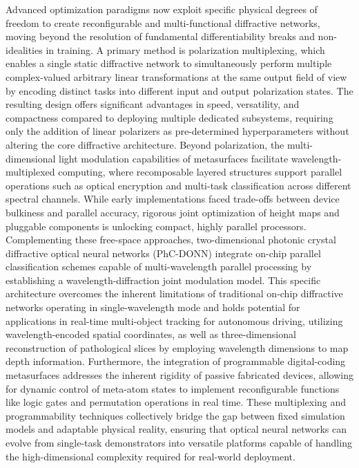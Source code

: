 Advanced optimization paradigms now exploit specific physical degrees of freedom to create reconfigurable and multi-functional diffractive networks, moving beyond the resolution of fundamental differentiability breaks and non-idealities in training. A primary method is polarization multiplexing, which enables a single static diffractive network to simultaneously perform multiple complex-valued arbitrary linear transformations at the same output field of view by encoding distinct tasks into different input and output polarization states. The resulting design offers significant advantages in speed, versatility, and compactness compared to deploying multiple dedicated subsystems, requiring only the addition of linear polarizers as pre-determined hyperparameters without altering the core diffractive architecture. Beyond polarization, the multi-dimensional light modulation capabilities of metasurfaces facilitate wavelength-multiplexed computing, where recomposable layered structures support parallel operations such as optical encryption and multi-task classification across different spectral channels. While early implementations faced trade-offs between device bulkiness and parallel accuracy, rigorous joint optimization of height maps and pluggable components is unlocking compact, highly parallel processors. Complementing these free-space approaches, two-dimensional photonic crystal diffractive optical neural networks (PhC-DONN) integrate on-chip parallel classification schemes capable of multi-wavelength parallel processing by establishing a wavelength-diffraction joint modulation model. This specific architecture overcomes the inherent limitations of traditional on-chip diffractive networks operating in single-wavelength mode and holds potential for applications in real-time multi-object tracking for autonomous driving, utilizing wavelength-encoded spatial coordinates, as well as three-dimensional reconstruction of pathological slices by employing wavelength dimensions to map depth information. Furthermore, the integration of programmable digital-coding metasurfaces addresses the inherent rigidity of passive fabricated devices, allowing for dynamic control of meta-atom states to implement reconfigurable functions like logic gates and permutation operations in real time. These multiplexing and programmability techniques collectively bridge the gap between fixed simulation models and adaptable physical reality, ensuring that optical neural networks can evolve from single-task demonstrators into versatile platforms capable of handling the high-dimensional complexity required for real-world deployment. \citep{doi_10_1038_s41377_022_00849_x_e31226af} \citep{doi_10_1515_nanoph_2024_0483_f81cb7ab} \citep{doi_10_1038_s41928_022_00719_9_a2169947} \citep{doi_10_1515_nanoph_2025_0168_86a0f7aa}

